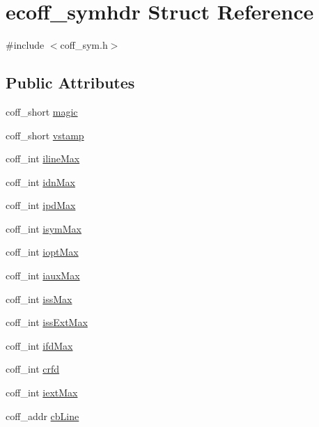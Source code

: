 \hypertarget{structecoff__symhdr}{
\section{ecoff\_\-symhdr Struct Reference}
\label{structecoff__symhdr}
}


{\ttfamily \#include $<$coff\_\-sym.h$>$}

\subsection*{Public Attributes}
\begin{DoxyCompactItemize}
\item 
coff\_\-short \hyperlink{structecoff__symhdr_ae9efacde79d203a1824cfde09a5c6500}{magic}
\item 
coff\_\-short \hyperlink{structecoff__symhdr_a0dbd0fac495bc661ebe3383552013726}{vstamp}
\item 
coff\_\-int \hyperlink{structecoff__symhdr_aa9947e723a01d6378ed750d0e670d8c8}{ilineMax}
\item 
coff\_\-int \hyperlink{structecoff__symhdr_a1f7409b84910fcb79d17f09469c276aa}{idnMax}
\item 
coff\_\-int \hyperlink{structecoff__symhdr_ab9d4b7e346f378af3c18bc60287cbb0c}{ipdMax}
\item 
coff\_\-int \hyperlink{structecoff__symhdr_a5d15acd3562ecad9acd13852e1d04b5a}{isymMax}
\item 
coff\_\-int \hyperlink{structecoff__symhdr_a7fdb913458962e5729f9c61dc0e2f411}{ioptMax}
\item 
coff\_\-int \hyperlink{structecoff__symhdr_af34c32c85664f1ac3f8f128e5e15c7fe}{iauxMax}
\item 
coff\_\-int \hyperlink{structecoff__symhdr_acfc7e74a0ebb9528528dd9f30987c8ed}{issMax}
\item 
coff\_\-int \hyperlink{structecoff__symhdr_a381c27bb3c0fadffe21d1e0fe5944fdd}{issExtMax}
\item 
coff\_\-int \hyperlink{structecoff__symhdr_ae74f3065bb14175ca47720d7ff835b2f}{ifdMax}
\item 
coff\_\-int \hyperlink{structecoff__symhdr_a5654c4aeafb48dd0568b2a4520ea7077}{crfd}
\item 
coff\_\-int \hyperlink{structecoff__symhdr_ac5ae9195dfa38ce7aa92d3c300d7a7d9}{iextMax}
\item 
coff\_\-addr \hyperlink{structecoff__symhdr_abb073ea09b9427af1e9987f867b483bc}{cbLine}
\item 

\end{DoxyCompactItemize}
